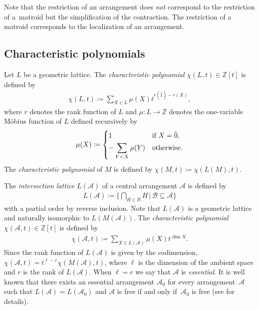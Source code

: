 \documentclass[pdftex]{sigma}
\numberwithin{equation}{section}
\begin{document}
Note that the restriction of an arrangement does \emph{not} correspond to the restriction of a~matroid but the simplification of the contraction.
The restriction of a matroid corresponds to the localization of an arrangement.

\subsection{Characteristic polynomials}

Let $ L $ be a geometric lattice.
The \textit{characteristic polynomial} $ \chi(L,t) \in \mathbb{Z}[t] $ is defined by
\begin{gather*}
\chi(L,t) \coloneqq \sum_{X \in L}\mu(X)t^{r(\hat{1}) - r(X)},
\end{gather*}
where $ r $ denotes the rank function of $ L $ and $ \mu \colon L \to \mathbb{Z} $ denotes the one-variable M\"{o}bius function of $ L $ defined recursively by{\samepage
\begin{gather*}
\mu(X) \coloneqq \begin{cases}
 1 & \text{if } X = \hat{0}, \vspace{1mm}\\
-\displaystyle\sum_{Y < X}\mu(Y) & \text{otherwise.}
\end{cases}
\end{gather*}
The \textit{characteristic polynomial} of $ M $ is defined by $ \chi(M,t) \coloneqq \chi(L(M),t) $.}

The \textit{intersection lattice} $ L(\mathcal{A}) $ of a central arrangement $ \mathcal{A} $ is defined by
\begin{gather*}
L(\mathcal{A}) \coloneqq \bigg\{ \bigcap_{H \in \mathcal{B}}H \,\bigg|\, \mathcal{B} \subseteq \mathcal{A} \bigg\}
\end{gather*}
with a partial order by reverse inclusion.
Note that $ L(\mathcal{A}) $ is a geometric lattice and naturally isomorphic to $ L(M(\mathcal{A})) $.
The \textit{characteristic polynomial} $ \chi(\mathcal{A}, t) \in \mathbb{Z}[t] $ is defined by
\begin{gather*}
\chi(\mathcal{A},t) \coloneqq \sum_{X \in L(\mathcal{A})}\mu(X)t^{\dim X}.
\end{gather*}
Since the rank function of $ L(\mathcal{A}) $ is given by the codimension, $ \chi(\mathcal{A},t) = t^{\ell-r}\chi(M(\mathcal{A}), t) $, where $ \ell $ is the dimension of the ambient space and $ r $ is the rank of $ L(\mathcal{A}) $.
When $ \ell = r $ we say that $ \mathcal{A} $ is \textit{essential}.
It is well known that there exists an essential arrangement $ \mathcal{A}_{0} $ for every arrangement~$ \mathcal{A} $ such that $ L(\mathcal{A}) = L(\mathcal{A}_{0}) $ and $ \mathcal{A} $ is free if and only if~$ \mathcal{A}_{0} $ is free (see \cite{orlik1992arrangements} for details).
\end{document}
